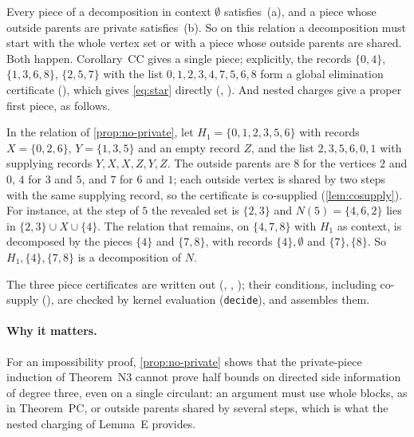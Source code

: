 Every piece of a decomposition in context $\emptyset$ satisfies~(a), and a piece whose outside parents are private
satisfies~(b). So on this relation a decomposition must start with the whole vertex set or with a piece whose outside
parents are shared. Both happen. Corollary~CC gives a single piece; explicitly, the records $\{0,4\}$, $\{1,3,6,8\}$,
$\{2,5,7\}$ with the list $0,1,2,3,4,7,5,6,8$ form a global elimination certificate (), which gives
\eqref{eq:star} directly (, ). And nested charges give a proper
first piece, as follows.

\begin{example}\label{ex:D9}
In the relation of \cref{prop:no-private}, let $H_1=\{0,1,2,3,5,6\}$ with records $X=\{0,2,6\}$, $Y=\{1,3,5\}$ and an
empty record $Z$, and the list $2,3,5,6,0,1$ with supplying records $Y,X,X,Z,Y,Z$. The outside parents are $8$ for the
vertices $2$ and $0$, $4$ for $3$ and $5$, and $7$ for $6$ and $1$; each outside vertex is shared by two steps with the
same supplying record, so the certificate is co-supplied (\cref{lem:cosupply}). For instance, at the step of $5$ the
revealed set is $\{2,3\}$ and $N(5)=\{4,6,2\}$ lies in $\{2,3\}\cup X\cup\{4\}$. The relation that remains,
on $\{4,7,8\}$ with $H_1$ as context, is decomposed by the pieces $\{4\}$ and $\{7,8\}$, with records $\{4\},\emptyset$
and $\{7\},\{8\}$. So $H_1,\{4\},\{7,8\}$ is a decomposition of $N$.
\end{example}

\begin{outline}
The three piece certificates are written out (, , ); their
conditions, including co-supply (), are checked by kernel evaluation (\texttt{decide}), and
 assembles them.
\end{outline}

\paragraph{Why it matters.} For an impossibility proof, \cref{prop:no-private} shows that the private-piece induction of
Theorem~N3 cannot prove half bounds on directed side information of degree three, even on a single circulant: an argument
must use whole blocks, as in Theorem~PC, or outside parents shared by several steps, which is what the nested charging of
Lemma~E provides.

